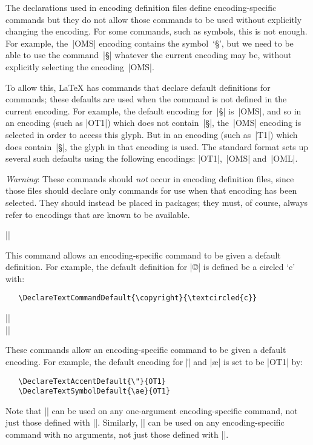 \documentclass{ltxguide}[1995/11/28]
\begin{document}
The declarations used in encoding definition files define
encoding-specific commands but they do not allow those commands to be
used without explicitly changing the encoding.  For some commands, such
as symbols, this is not enough.  For example, the~|OMS| encoding
contains the symbol~`\S', but we need to be able to use the command~|\S|
whatever the current encoding may be, without explicitly selecting the
encoding~|OMS|.

To allow this, \LaTeX{} has commands that declare default definitions
for commands; these defaults are used when the command is not defined in
the current encoding.  For example, the default encoding for~|\S|
is~|OMS|, and so in an encoding (such as |OT1|) which does not
contain~|\S|, the~|OMS| encoding is selected in order to access this
glyph.  But in an encoding (such as~|T1|) which does contain~|\S|, the
glyph in that encoding is used.  The standard \LaTeXe{} format sets up
several such defaults using the following encodings: |OT1|,~|OMS|
and~|OML|.

\emph{Warning}: These commands should \emph{not} occur in encoding
definition files, since those files should declare only commands for use
when that encoding has been selected.  They should instead be placed in
packages; they must, of course, always refer to encodings that are known
to be available.

\begin{decl}[1994/12/01]
  |\DeclareTextCommandDefault|  
\end{decl}
This command allows an encoding-specific command to be given a default
definition.  For example, the default definition for |\copyright| is
defined be a circled `c' with:
\begin{verbatim}
   \DeclareTextCommandDefault{\copyright}{\textcircled{c}}
\end{verbatim}
\begin{decl}[1994/12/01]
  |\DeclareTextAccentDefault|   \\
  |\DeclareTextSymbolDefault|  
\end{decl}
These commands allow an encoding-specific command to be given a default
encoding.  For example, the default encoding for |\"| and |\ae| is set
to be |OT1| by:
\begin{verbatim}
   \DeclareTextAccentDefault{\"}{OT1}
   \DeclareTextSymbolDefault{\ae}{OT1}
\end{verbatim}
Note that |\DeclareTextAccentDefault| can be used on any one-argument
encoding-specific command, not just those defined with
|\DeclareTextAccent|.  Similarly, |\DeclareTextSymbolDefault| can be
used on any encoding-specific command with no arguments, not just those
defined with |\DeclareTextSymbol|.
\end{document}
